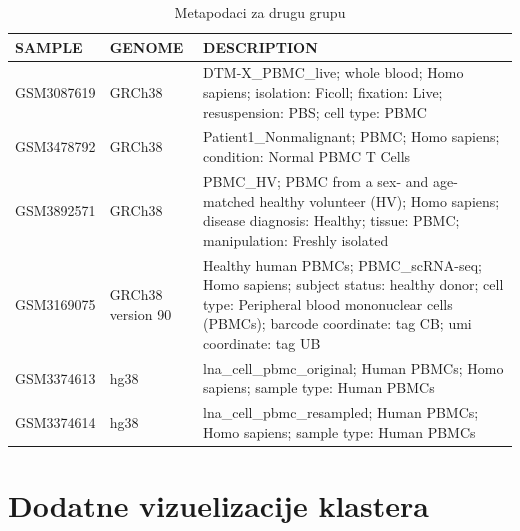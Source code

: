 \documentclass[a4paper]{article}
\begin{document}
\begin{center}
\begin{table}[H]
\caption{Metapodaci za drugu grupu}
\begin{adjustbox}{width=1\textwidth}
\begin{tabularx}{\textwidth}{llY}
\toprule
     SAMPLE &             GENOME &                                                                                                                                                                                  DESCRIPTION \\
\midrule
 GSM3087619 &             GRCh38 &                                                                            DTM-X\_PBMC\_live; whole blood; Homo sapiens; isolation: Ficoll; fixation: Live; resuspension: PBS; cell type: PBMC \\
 GSM3478792 &             GRCh38 &                                                                                                                    Patient1\_Nonmalignant; PBMC; Homo sapiens; condition: Normal PBMC T Cells \\
 GSM3892571 &             GRCh38 &                                     PBMC\_HV; PBMC from a sex- and age-matched healthy volunteer (HV); Homo sapiens; disease diagnosis: Healthy; tissue: PBMC; manipulation: Freshly isolated \\
 GSM3169075 &  GRCh38 version 90 &  Healthy human PBMCs; PBMC\_scRNA-seq; Homo sapiens; subject status: healthy donor; cell type: Peripheral blood mononuclear cells (PBMCs); barcode coordinate: tag CB; umi coordinate: tag UB \\
 GSM3374613 &               hg38 &                                                                                                                  lna\_cell\_pbmc\_original; Human PBMCs; Homo sapiens; sample type: Human PBMCs \\
 GSM3374614 &               hg38 &                                                                                                                 lna\_cell\_pbmc\_resampled; Human PBMCs; Homo sapiens; sample type: Human PBMCs \\
\bottomrule
\end{tabularx}
\end{adjustbox}
\label{group2_metadata}
\end{table}
\end{center}



\section{Dodatne vizuelizacije klastera}
\end{document}
